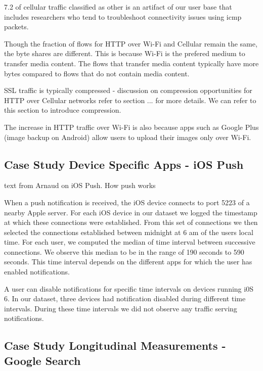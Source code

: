 7.2 of cellular traffic classified as other is an artifact of our user base that includes
researchers who tend to troubleshoot connectivity issues using icmp packets.

Though the fraction of flows for HTTP over Wi-Fi and Cellular remain
the same, the byte shares are different. This is because Wi-Fi is the
prefered medium to transfer media content. The flows that transfer media content
typically have more bytes compared to flows that do not contain media
content. 

SSL traffic is typically compressed - discussion on compression
opportunities for HTTP over Cellular networks refer to section ... for
more details. We can refer to this section to introduce
compression.

The increase in HTTP traffic over Wi-Fi is also because apps such as
Google Plus (image backup on Android) allow users to upload their
images only over Wi-Fi.


\subsection{Case Study Device Specific Apps - iOS Push}
\label{sec:case-study-ios}

text from Arnaud on iOS Push. How push works


When a push notification is received, the iOS device connects to port
5223 of a nearby Apple server. For each iOS device in our dataset we
logged the timestamp at which these connections were established. From
this set of connections we then selected the connections established
between midnight at 6 am of the users local time. For each user, we
computed the median of time interval between successive
connections. We observe this median to be in the range of 190 seconds
to 590 seconds. This time interval depends on the different apps for
which the user has enabled notifications. 

A user can disable notifications for specific time intervals on
devices running i0S 6. In our dataset, three devices had notification
disabled during different time intervals. During these time intervals
we did not observe any traffic serving notifications.


\subsection{Case Study Longitudinal Measurements - Google Search }
\label{sec:case-study-google}



